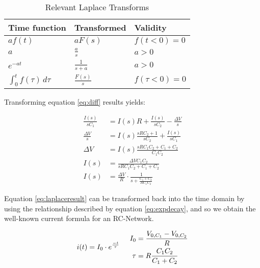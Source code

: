 \begin{table}
    \centering
    \caption{Relevant Laplace Transforms}
    \begin{threeparttable}\begin{tabular}{lll}
        \toprule
        \textbf{Time function}              & \textbf{Transformed} & \textbf{Validity} \\
        \midrule
        $af(t)$                   & $aF(s)$              & $f(t<0)=0$ \\
        $a$                       & $\frac{a}{s}$        & $a > 0$ \\
        $e^{-at}$                 & $\frac{1}{s+a}$      & $a > 0$  \\
        $\int_0^t f(\tau)\,d\tau$ & $\frac{F(s)}{s}$     & $f(\tau<0)=0$ \\
        \bottomrule
    \end{tabular}\end{threeparttable}
    \label{tab:laplace-transforms}
\end{table}

Transforming equation \ref{eq:diff} results yields:

\begin{align}
    \frac{I(s)}{sC_1} &= I(s)R + \frac{I(s)}{sC_2} - \frac{\Delta V}{s}\\
    \frac{\Delta V}{s} &= I(s)\frac{sRC_2 + 1}{sC_2} + \frac{I(s)}{sC_1} \\
    \Delta V &= I(s)\frac{sRC_1C_2 + C_1 + C_2}{C_1C_2} \\
    I(s) &= \frac{\Delta V C_1 C_2}{sRC_1C_2 + C_1 + C_2} \\
    I(s) &= \frac{\Delta V}{R}\cdot\frac{1}{s + \frac{C_1 + C_2}{RC_1C_2}} \label{eq:laplaceresult}
\end{align}

Equation \ref{eq:laplaceresult} can  be  transformed back into the time domain
by using the relationship described by  equation  \ref{eq:expdecay}, and so we
obtain the well-known current formula for an RC-Network.

\begin{equation}
    i(t) = I_0 \cdot e^{\frac{-t}{\tau}} \hspace{5mm} \begin{aligned}
        I_0  &= \frac{V_{0,C_1}-V_{0,C_2}}{R} \\
        \tau &= R \frac{C_1C_2}{C_1+C_2}
    \end{aligned}
    \label{eq:currentresult}
\end{equation}

